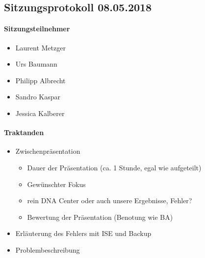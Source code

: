 \newpage


\subsection{Sitzungsprotokoll 08.05.2018}

\paragraph{Sitzungsteilnehmer}
\begin{itemize}	
	\item Laurent Metzger 
	\item Urs Baumann
	\item Philipp Albrecht
	\item Sandro Kaspar
	\item Jessica Kalberer
\end{itemize}

\paragraph{Traktanden}
\begin{itemize}	
	\item Zwischenpräsentation
	\begin{itemize}
		\item Dauer der Präsentation (ca. 1 Stunde, egal wie aufgeteilt)
		\item Gewünschter Fokus
		\item rein DNA Center oder auch unsere Ergebnisse, Fehler?
		\item Bewertung der Präsentation (Benotung wie BA)
	\end{itemize}
	\item Erläuterung des Fehlers mit ISE und Backup
	\item Problembeschreibung
\end{itemize}

